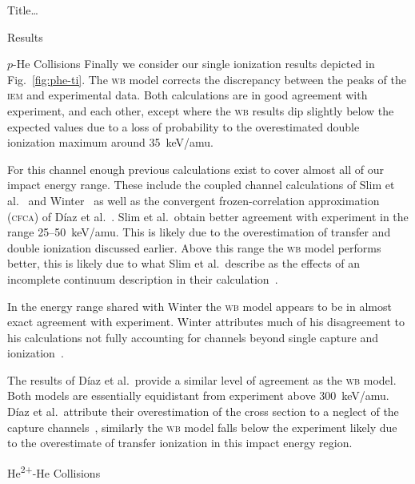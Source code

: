 \documentclass[letterpaper, 10 pt]{report}
\begin{document}
\begin{chapter}{ Title\dots \label{chap:p-he2p-he}}
\begin{section}{Results \label{sec:phe2p-res}}
\begin{subsection}{\texorpdfstring{$p$}{p}-He Collisions \label{sec:phe-res}}
         Finally we consider our single ionization results depicted in Fig.~\ref{fig:phe-ti}. The
         \textsc{wb} model corrects the discrepancy between the peaks of the \textsc{iem} and
         experimental data. Both calculations are in good agreement with experiment, and each other,
         except where the \textsc{wb} results dip slightly below the expected values due to a loss of
         probability to the overestimated double ionization maximum around 35~keV/amu.

         For this channel enough previous calculations exist to cover almost all of our impact energy
         range. These include the coupled channel calculations of Slim et al.~\cite{SHBF-91} and
         Winter~\cite{Winter-91} as well as the convergent frozen-correlation approximation
         (\textsc{cfca}) of D\'{i}az et al.~\cite{DMS-00}. Slim et al.\ obtain better agreement with
         experiment in the range 25--50~keV/amu. This is likely due to the overestimation of transfer
         and double ionization discussed earlier. Above this range the \textsc{wb} model performs
         better, this is likely due to what Slim et al.\ describe as the effects of an incomplete
         continuum description in their calculation~\cite{SHBF-91}.
 
         In the energy range shared with Winter the \textsc{wb} model appears to be in almost exact
         agreement with experiment. Winter attributes much of his disagreement to his calculations not
         fully accounting for channels beyond single capture and ionization~\cite{Winter-91}.

         The results of D\'{i}az et al.\ provide a similar level of agreement as the \textsc{wb} model.
         Both models are essentially equidistant from experiment above 300~keV/amu. D\'{i}az
         et al.\ attribute their overestimation of the cross section to a neglect of the
         capture channels~\cite{DMS-00}, similarly the \textsc{wb} model falls below the experiment
         likely due to the overestimate of transfer ionization in this impact energy region.

      \end{subsection}

      \begin{subsection}{\texorpdfstring{He\textsuperscript{2+}}{He2+}-He Collisions 
                         \label{sec:he2phe-res}}

         \begin{figure}[ht]
            \begin{minipage}{.49\linewidth}
 

\end{minipage}
\end{figure}
\end{subsection}
\end{section}
\end{chapter}
\end{document}
